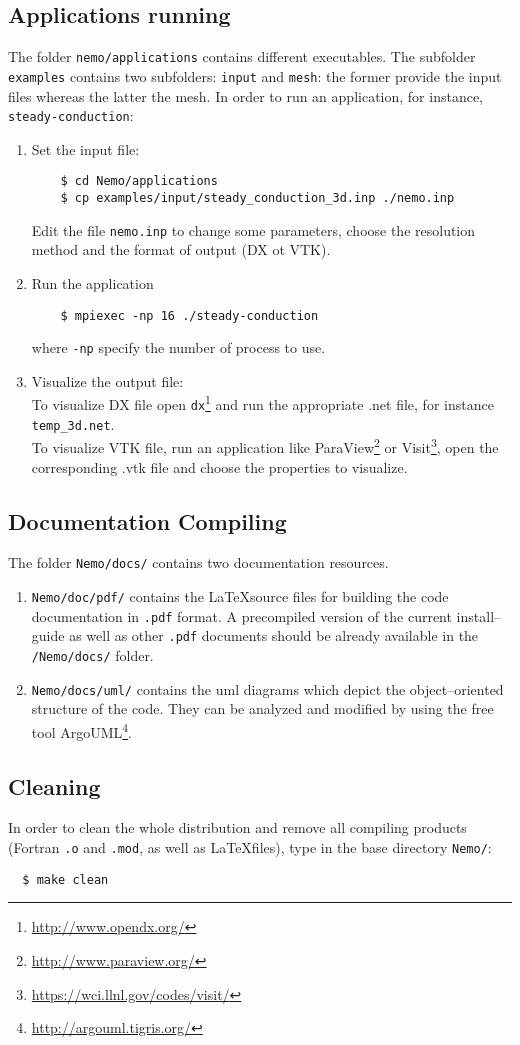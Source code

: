 \documentclass[a4paper,12pt]{article}%
\begin{document}
\subsection{Applications running}
The folder \verb+nemo/applications+ contains different executables.
The subfolder \verb+examples+ contains two subfolders: \verb+input+ and
\verb+mesh+: the former provide the input files whereas the latter the mesh.
In order to run an application, for instance, \verb+steady-conduction+:
\begin{enumerate}
\item Set the input file:
\begin{Verbatim}
    $ cd Nemo/applications
    $ cp examples/input/steady_conduction_3d.inp ./nemo.inp
\end{Verbatim}
Edit the file \verb+nemo.inp+ to change some parameters, choose the resolution method and the format of output (DX ot VTK).
\item Run the application
\begin{Verbatim}
    $ mpiexec -np 16 ./steady-conduction
\end{Verbatim}
where \verb+-np+ specify the number of process to use.
\item Visualize the output file:\\
To visualize DX file open \verb+dx+\footnote{\url{http://www.opendx.org/}} and run the appropriate .net file, for instance \verb+temp_3d.net+. \\
To visualize VTK file, run an application like ParaView\footnote{\url{http://www.paraview.org/}} or Visit\footnote{\url{https://wci.llnl.gov/codes/visit/}}, open the corresponding .vtk  file and choose the properties to visualize.
\end{enumerate}

\subsection{Documentation Compiling}

The folder \verb+Nemo/docs/+ contains two documentation resources.
\begin{enumerate}
\item \verb+Nemo/doc/pdf/+ contains the \LaTeX source files for
  building the code documentation in \verb+.pdf+ format. A precompiled
  version of the current install--guide as well as other \verb+.pdf+
  documents should be already available in the \verb+/Nemo/docs/+
  folder.
\item \verb+Nemo/docs/uml/+ contains the uml diagrams which depict the
  object--oriented structure of the code. They can be analyzed and
  modified by using the free tool
  ArgoUML\footnote{\url{http://argouml.tigris.org/}}.
\end{enumerate}


\subsection{Cleaning}
In order to clean the whole distribution and remove all compiling
products (Fortran \verb+.o+ and \verb+.mod+, as well as \LaTeX files),
type in the base directory \verb+Nemo/+:
\begin{Verbatim}
  $ make clean
\end{Verbatim}
\end{document}
